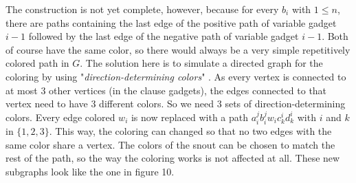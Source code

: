 \documentclass[12pt,a4paper]{article}
\begin{document}
\newline
The construction is not yet complete, however, because for every $b_i$ with $1 \leq n$, there are paths containing the last edge of the positive path of variable gadget $i-1$ followed by the last edge of the negative path of variable gadget $i-1$. Both of course have the same color, so there would always be a very simple repetitively colored path in $G$. The solution here is to simulate a directed graph for the coloring by using "\textit{direction-determining colors}" \citep[p. 6]{Manin2008}. As every vertex is connected to at most 3 other vertices (in the clause gadgets), the edges connected to that vertex need to have 3 different colors. So we need 3 sets of direction-determining colors. Every edge colored $w_i$ is now replaced with a path $a^j_ib^j_iw_ic^i_kd^i_k$ with $i$ and $k$ in $\{ 1, 2, 3 \}$. This way, the coloring can changed so that no two edges with the same color share a vertex. The colors of the snout can be chosen to match the rest of the path, so the way the coloring works is not affected at all. These new subgraphs look like the one in figure 10.
\newline
\end{document}
